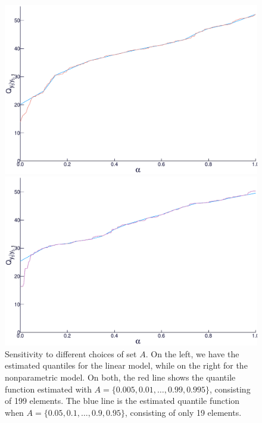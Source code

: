 \begin{figure}
	\centering
	\begin{minipage}[t]{\linewidth}
		\centering
		\begin{minipage}[t]{0.45\linewidth}
			\centering     \includegraphics[width=\textwidth]{Figuras/regressao-quantilica/icaraizinho-quantile-vs-alphas-linear}
		\end{minipage}
		\begin{minipage}[t]{0.45\linewidth}
			\centering     \includegraphics[width=\textwidth]{Figuras/regressao-quantilica/icaraizinho-quantile-vs-alphas-nonpar}
		\end{minipage}
	\end{minipage}
	\caption{Sensitivity to different choices of set $A$. On the left, we have the estimated quantiles for the linear model, while on the right for the nonparametric model. On both, the red line shows the quantile function estimated with $A=\{0.005, 0.01, \dots, 0.99, 0.995 \}$, consisting of 199 elements. The blue line is the estimated quantile function when $A=\{0.05, 0.1, \dots, 0.9, 0.95 \}$, consisting of only 19 elements.}
	\label{fig:quantiles-vs-xt}
\end{figure}



